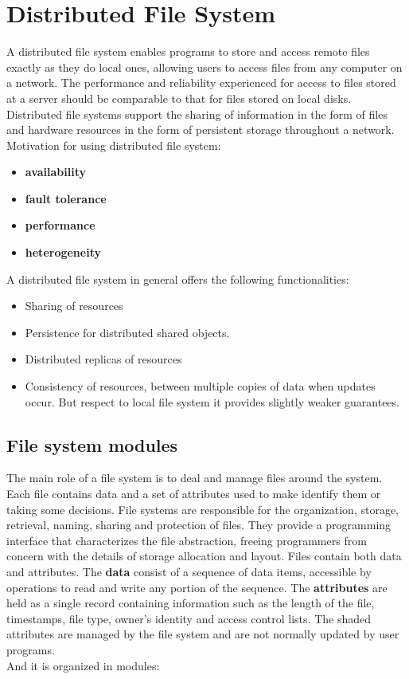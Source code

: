 \section{Distributed File System}
A distributed file system enables programs to store and access remote files exactly as they do local ones, allowing users to access files from any computer on a network. The performance and reliability experienced for access to files stored at a server should be comparable to that for files stored on local disks. Distributed file systems support the sharing of information in the form of files and hardware resources in the form of persistent storage throughout a network.\\
Motivation for using distributed file system:
\begin{itemize}
	\item \textbf{availability}
	\item \textbf{fault tolerance}
	\item \textbf{performance} 
	\item \textbf{heterogeneity}
\end{itemize}

A distributed file system in general offers the following functionalities:
\begin{itemize}
	\item Sharing of resources
	\item Persistence for distributed shared objects.
	\item Distributed replicas of resources
	\item Consistency of resources, between multiple copies of data when updates occur. But respect to local file system it provides slightly weaker guarantees.
\end{itemize}

\subsection{File system modules}
The main role of a file system is to deal and manage files around the system. Each file contains data and a set of attributes used to make identify them or taking some decisions.
File systems are responsible for the organization, storage, retrieval, naming, sharing and
protection of files. They provide a programming interface that characterizes the file abstraction, freeing programmers from concern with the details of storage allocation and layout. Files contain both data and attributes. The \textbf{data} consist of a sequence of data items, accessible by operations to read and write any portion of the sequence. The \textbf{attributes} are held as a single record containing information such as the length of the file, timestamps, file type, owner’s identity and access control lists. The shaded attributes are managed by the file system and are not normally updated by user programs.\\
And it is organized in modules:

